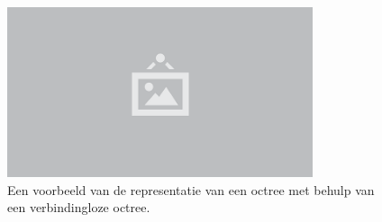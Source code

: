 \begin{figure}
  \centering
  \includegraphics[width=0.8\textwidth]{./img/raw/placeholder.png}
  \caption{Een voorbeeld van de representatie van een octree met behulp van een verbindingloze octree.}
  \label{fig:hs-linkless-octree-representation}
\end{figure}
